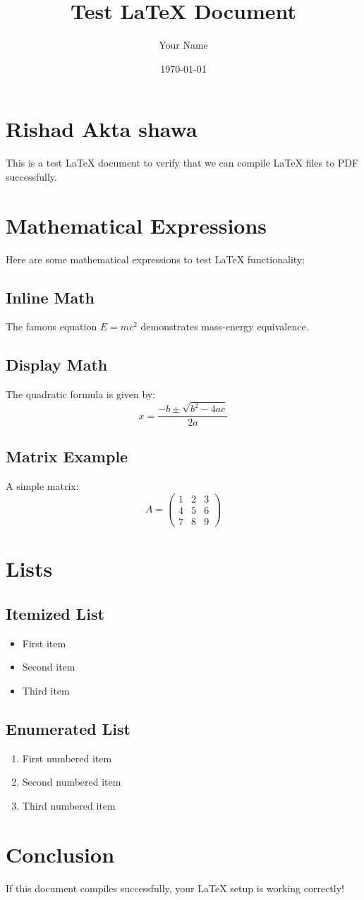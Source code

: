 \documentclass{article}
\title{Test LaTeX Document}
\author{Your Name}
\date{\today}
\begin{document}
\maketitle

\section{Rishad Akta shawa}
This is a test LaTeX document to verify that we can compile LaTeX files to PDF successfully.

\section{Mathematical Expressions}
Here are some mathematical expressions to test LaTeX functionality:

\subsection{Inline Math}
The famous equation $E = mc^2$ demonstrates mass-energy equivalence.

\subsection{Display Math}
The quadratic formula is given by:
\[
x = \frac{-b \pm \sqrt{b^2 - 4ac}}{2a}
\]

\subsection{Matrix Example}
A simple matrix:
\[
A = \begin{pmatrix}
1 & 2 & 3 \\
4 & 5 & 6 \\
7 & 8 & 9
\end{pmatrix}
\]

\section{Lists}
\subsection{Itemized List}
\begin{itemize}
    \item First item
    \item Second item
    \item Third item
\end{itemize}

\subsection{Enumerated List}
\begin{enumerate}
    \item First numbered item
    \item Second numbered item
    \item Third numbered item
\end{enumerate}

\section{Conclusion}
If this document compiles successfully, your LaTeX setup is working correctly!
\end{document}
